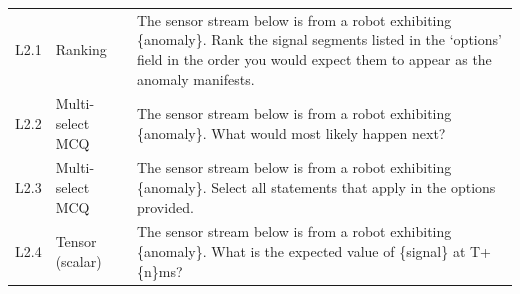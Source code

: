 \documentclass{article}
\begin{document}
\begin{small}
\begin{longtable}{@{}>{\centering\arraybackslash}p{}>{\raggedright\arraybackslash}p{}>{\raggedright\arraybackslash}p{}@{}}
        \multicolumn{3}{@{}l@{}}{\textbf{Level 2: Intervention}}                                                                                                                                                                                                                                                                                                                                                                                                                                                                                  \\
        \midrule
        L2.1        & Ranking                & The sensor stream below is from a robot exhibiting \{anomaly\}. Rank the signal segments listed in the `options' field in the order you would expect them to appear as the anomaly manifests.                                                                                                                                                                                                                                                                                                      \\
        L2.2        & Multi-select MCQ       & The sensor stream below is from a robot exhibiting \{anomaly\}. What would most likely happen next?                                                                                                                                                                                                                                                                                                                                                                                                \\
        L2.3        & Multi-select MCQ       & The sensor stream below is from a robot exhibiting \{anomaly\}. Select all statements that apply in the options provided.                                                                                                                                                                                                                                                                                                                                                                          \\
        L2.4        & Tensor (scalar)        & The sensor stream below is from a robot exhibiting \{anomaly\}. What is the expected value of \{signal\} at T+\{n\}ms?                                                                                                                                                                                                                                                                                                                                                                             \\

\end{longtable}
\end{small}
\end{document}
